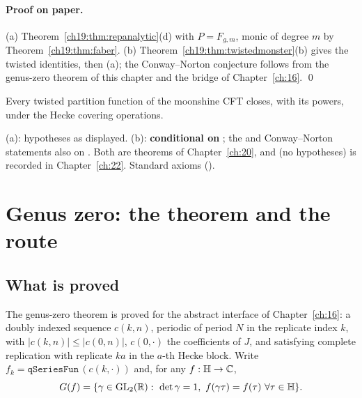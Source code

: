 \paragraph{Proof on paper.}  (a) Theorem~\ref{ch19:thm:repanalytic}(d) with $P=F_{g,m}$, monic of degree $m$ by
Theorem~\ref{ch19:thm:faber}.  (b) Theorem~\ref{ch19:thm:twistedmonster}(b) gives the twisted identities, then (a); the
Conway--Norton conjecture follows from the genus-zero theorem of this chapter and the bridge of Chapter~\ref{ch:16}. \qed
\begin{physics}Every twisted partition function of the moonshine CFT closes, with its powers, under the Hecke covering
operations.\end{physics}
\begin{status}
(a): hypotheses as displayed.  (b): \textbf{conditional on} ; the  and Conway--Norton
statements also on .  Both are theorems of Chapter~\ref{ch:20}, and  (no hypotheses)
is recorded in Chapter~\ref{ch:22}.  Standard axioms ().
\end{status}

\section{Genus zero: the theorem and the route}\label{ch19:sec:gz}

\subsection{What is proved}

The genus-zero theorem is proved for the abstract interface  of Chapter~\ref{ch:16}: a doubly
indexed sequence $c(k,n)$, periodic of period $N$ in the replicate index $k$, with $|c(k,n)|\le|c(0,n)|$, $c(0,\cdot)$ the
coefficients of $J$, and satisfying complete replication with replicate $ka$ in the $a$-th Hecke block.  Write
$f_k=\mathtt{qSeriesFun}\,(c(k,\cdot))$ and, for any $f:\mathbb{H}\to{\mathbb{C}}$,
\begin{equation*}
  G(f)=\{\gamma\in\chnineteenGLR:\ \det\gamma=1,\ f(\gamma\tau)=f(\tau)\ \forall\tau\in\chnineteenH\}.
\end{equation*}

